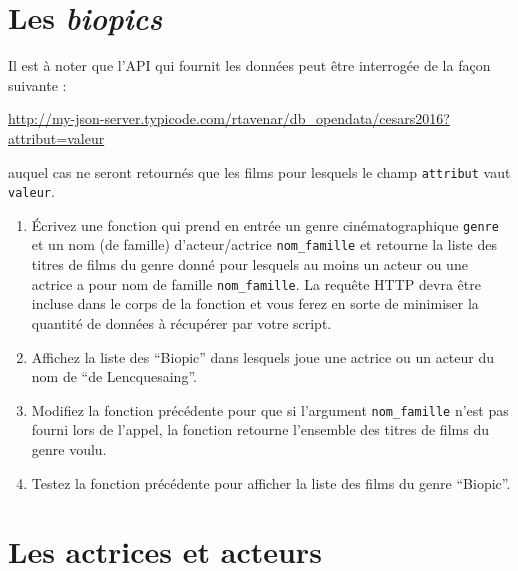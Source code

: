 \documentclass[11pt,a4paper]{article}
\begin{document}
\section{Les \emph{biopics}}

Il est à noter que l'API qui fournit les données peut être interrogée de la façon suivante :
\begin{center}
    \url{http://my-json-server.typicode.com/rtavenar/db_opendata/cesars2016?attribut=valeur}
\end{center}
auquel cas ne seront retournés que les films pour lesquels le champ \verb+attribut+ vaut \verb+valeur+.


\begin{enumerate}
    \item Écrivez une fonction qui prend en entrée un genre cinématographique \verb+genre+ et un nom (de famille) d'acteur/actrice \verb+nom_famille+ et retourne la liste des titres de films du genre donné pour lesquels au moins un acteur ou une actrice a pour nom de famille \verb+nom_famille+.
    La requête HTTP devra être incluse dans le corps de la fonction et vous ferez en sorte de minimiser la quantité de données à récupérer par votre script.

    \item Affichez la liste des ``Biopic'' dans lesquels joue une actrice ou un acteur du nom de ``de Lencquesaing''.
    \item Modifiez la fonction précédente pour que si l'argument \verb+nom_famille+ n'est pas fourni lors de l'appel, la fonction retourne l'ensemble des titres de films du genre voulu.
    \item Testez la fonction précédente pour afficher la liste des films du genre ``Biopic''.
   
\end{enumerate}



\section{Les actrices et acteurs}
\end{document}

